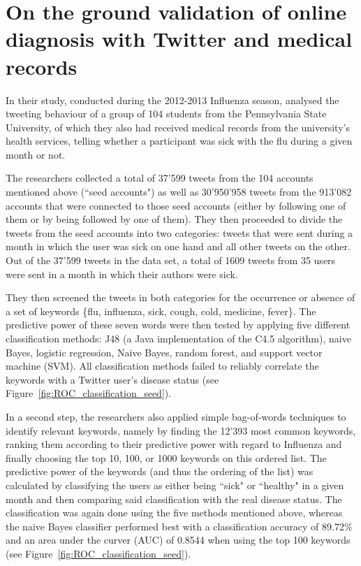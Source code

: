 \documentclass[11pt, a4paper,twoside]{report}\usepackage[]{graphicx}\usepackage[]{color}
\begin{document}
\section[On the ground validation of online diagnosis]{On the ground validation of online diagnosis with Twitter and medical records}
\label{sec:on_the_ground}
In their study, conducted during the 2012-2013 Influenza season, \cite{bodnar_ground_2014} analysed the tweeting behaviour of a group of 104 students from the Pennsylvania State University, of which they also had received medical records from the university's health services, telling whether a participant was sick with the flu during a given month or not.

The researchers collected a total of 37'599 tweets from the 104 accounts mentioned above (``seed accounts") as well as 30'950'958 tweets from the 913'082 accounts that were connected to those seed accounts (either by following one of them or by being followed by one of them). They then proceeded to divide the tweets from the seed accounts into two categories: tweets that were sent during a month in which the user was sick on one hand and all other tweets on the other. Out of the 37'599 tweets in the data set, a total of 1609 tweets from 35 users were sent in a month in which their authors were sick.

They then screened the tweets in both categories for the occurrence or absence of a set of keywords \{flu, influenza, sick, cough, cold, medicine, fever\}. The predictive power of these seven words were then tested by applying five different classification methods: J48 (a Java implementation of the C4.5 algorithm), naive Bayes, logistic regression, Naive Bayes, random forest, and support vector machine (SVM). All classification methods failed to reliably correlate the keywords with a Twitter user's disease status (see Figure~\ref{fig:ROC_classification_seed}).

In a second step, the researchers also applied simple bag-of-words techniques to identify relevant keywords, namely by finding the 12'393 most common keywords, ranking them according to their predictive power with regard to Influenza and finally choosing the top 10, 100, or 1000 keywords on this ordered list. The predictive power of the keywords (and thus the ordering of the list) was calculated by classifying the users as either being ``sick" or ``healthy" in a given month and then comparing said classification with the real disease status. The classification was again done using the five methods mentioned above, whereas the naive Bayes classifier performed best with a classification accuracy of 89.72\% and an area under the curver (AUC) of 0.8544 when using the top 100 keywords (see Figure~\ref{fig:ROC_classification_seed}).
\end{document}
